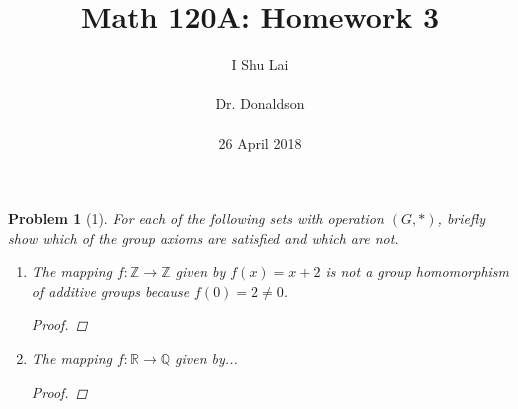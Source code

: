 \documentclass[11pt]{amsart}
\title{Math 120A: Homework 3}
\author{I Shu Lai\\\\Dr. Donaldson\\\\26 April 2018}
\theoremstyle{quest}
\newtheorem*{problem}{Problem}
\newcommand{\Z}{\mathbb{Z}}
\newcommand{\R}{\mathbb{R}}
\newcommand{\Q}{\mathbb{Q}}
\begin{document}
	\maketitle

  \begin{problem}[1]
    For each of the following sets with operation $(G, *)$, briefly show which of the group axioms are satisfied and which are not.
		\begin{enumerate}[label=(\alph*)]
			\item The mapping $f\colon \Z \to \Z$ given by $f(x)=x+2$ is not a group homomorphism of additive groups because $f(0)=2\neq 0$.
			\begin{proof}
			\end{proof}
			\item The mapping $f\colon \R \to \Q$ given by... 
			\begin{proof}
			\end{proof}
		\end{enumerate}
	\end{problem}

	
\end{document}
